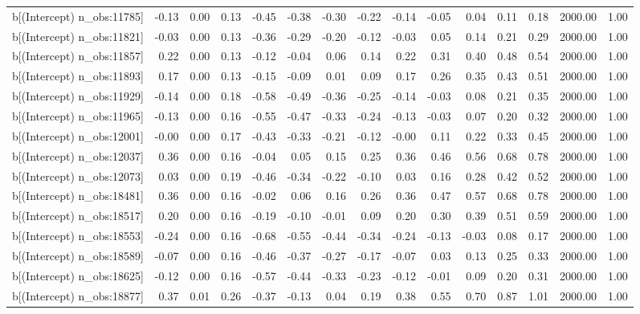 \begin{table}[ht]
\begin{tabular}{rrrrrrrrrrrrrrr}
  b[(Intercept) n\_obs:11785] & -0.13 & 0.00 & 0.13 & -0.45 & -0.38 & -0.30 & -0.22 & -0.14 & -0.05 & 0.04 & 0.11 & 0.18 & 2000.00 & 1.00 \\ 
  b[(Intercept) n\_obs:11821] & -0.03 & 0.00 & 0.13 & -0.36 & -0.29 & -0.20 & -0.12 & -0.03 & 0.05 & 0.14 & 0.21 & 0.29 & 2000.00 & 1.00 \\ 
  b[(Intercept) n\_obs:11857] & 0.22 & 0.00 & 0.13 & -0.12 & -0.04 & 0.06 & 0.14 & 0.22 & 0.31 & 0.40 & 0.48 & 0.54 & 2000.00 & 1.00 \\ 
  b[(Intercept) n\_obs:11893] & 0.17 & 0.00 & 0.13 & -0.15 & -0.09 & 0.01 & 0.09 & 0.17 & 0.26 & 0.35 & 0.43 & 0.51 & 2000.00 & 1.00 \\ 
  b[(Intercept) n\_obs:11929] & -0.14 & 0.00 & 0.18 & -0.58 & -0.49 & -0.36 & -0.25 & -0.14 & -0.03 & 0.08 & 0.21 & 0.35 & 2000.00 & 1.00 \\ 
  b[(Intercept) n\_obs:11965] & -0.13 & 0.00 & 0.16 & -0.55 & -0.47 & -0.33 & -0.24 & -0.13 & -0.03 & 0.07 & 0.20 & 0.32 & 2000.00 & 1.00 \\ 
  b[(Intercept) n\_obs:12001] & -0.00 & 0.00 & 0.17 & -0.43 & -0.33 & -0.21 & -0.12 & -0.00 & 0.11 & 0.22 & 0.33 & 0.45 & 2000.00 & 1.00 \\ 
  b[(Intercept) n\_obs:12037] & 0.36 & 0.00 & 0.16 & -0.04 & 0.05 & 0.15 & 0.25 & 0.36 & 0.46 & 0.56 & 0.68 & 0.78 & 2000.00 & 1.00 \\ 
  b[(Intercept) n\_obs:12073] & 0.03 & 0.00 & 0.19 & -0.46 & -0.34 & -0.22 & -0.10 & 0.03 & 0.16 & 0.28 & 0.42 & 0.52 & 2000.00 & 1.00 \\ 
  b[(Intercept) n\_obs:18481] & 0.36 & 0.00 & 0.16 & -0.02 & 0.06 & 0.16 & 0.26 & 0.36 & 0.47 & 0.57 & 0.68 & 0.78 & 2000.00 & 1.00 \\ 
  b[(Intercept) n\_obs:18517] & 0.20 & 0.00 & 0.16 & -0.19 & -0.10 & -0.01 & 0.09 & 0.20 & 0.30 & 0.39 & 0.51 & 0.59 & 2000.00 & 1.00 \\ 
  b[(Intercept) n\_obs:18553] & -0.24 & 0.00 & 0.16 & -0.68 & -0.55 & -0.44 & -0.34 & -0.24 & -0.13 & -0.03 & 0.08 & 0.17 & 2000.00 & 1.00 \\ 
  b[(Intercept) n\_obs:18589] & -0.07 & 0.00 & 0.16 & -0.46 & -0.37 & -0.27 & -0.17 & -0.07 & 0.03 & 0.13 & 0.25 & 0.33 & 2000.00 & 1.00 \\ 
  b[(Intercept) n\_obs:18625] & -0.12 & 0.00 & 0.16 & -0.57 & -0.44 & -0.33 & -0.23 & -0.12 & -0.01 & 0.09 & 0.20 & 0.31 & 2000.00 & 1.00 \\ 
  b[(Intercept) n\_obs:18877] & 0.37 & 0.01 & 0.26 & -0.37 & -0.13 & 0.04 & 0.19 & 0.38 & 0.55 & 0.70 & 0.87 & 1.01 & 2000.00 & 1.00 \\ 

\end{tabular}
\end{table}
